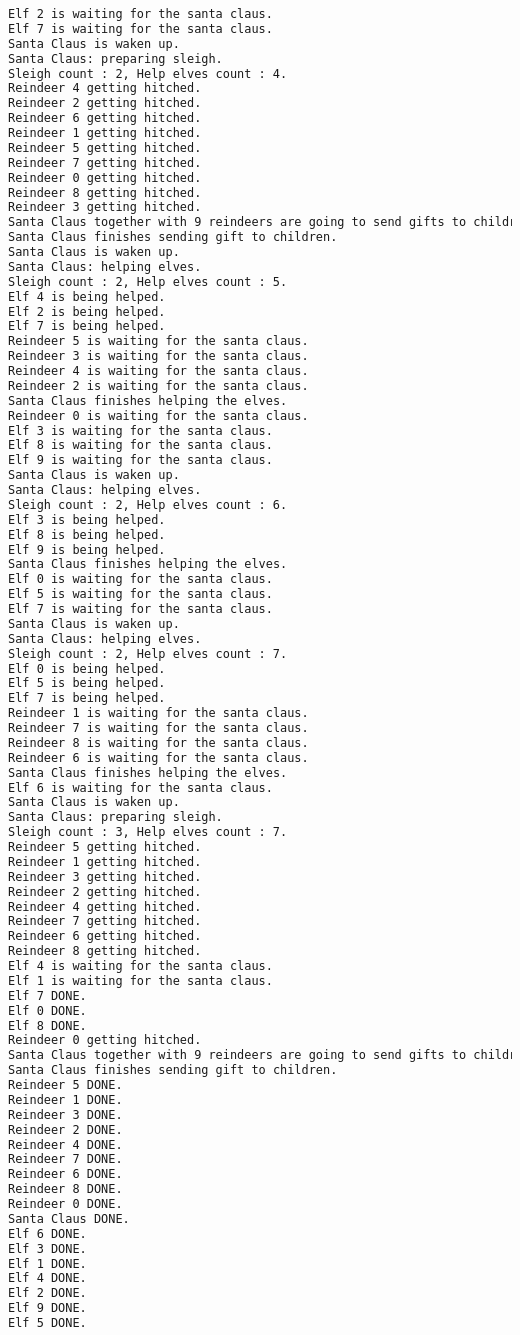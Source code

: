 \begin{lstlisting}[language=bash]
Elf 2 is waiting for the santa claus.
Elf 7 is waiting for the santa claus.
Santa Claus is waken up.
Santa Claus: preparing sleigh.
Sleigh count : 2, Help elves count : 4.
Reindeer 4 getting hitched.
Reindeer 2 getting hitched.
Reindeer 6 getting hitched.
Reindeer 1 getting hitched.
Reindeer 5 getting hitched.
Reindeer 7 getting hitched.
Reindeer 0 getting hitched.
Reindeer 8 getting hitched.
Reindeer 3 getting hitched.
Santa Claus together with 9 reindeers are going to send gifts to children around the world.
Santa Claus finishes sending gift to children.
Santa Claus is waken up.
Santa Claus: helping elves.
Sleigh count : 2, Help elves count : 5.
Elf 4 is being helped.
Elf 2 is being helped.
Elf 7 is being helped.
Reindeer 5 is waiting for the santa claus.
Reindeer 3 is waiting for the santa claus.
Reindeer 4 is waiting for the santa claus.
Reindeer 2 is waiting for the santa claus.
Santa Claus finishes helping the elves.
Reindeer 0 is waiting for the santa claus.
Elf 3 is waiting for the santa claus.
Elf 8 is waiting for the santa claus.
Elf 9 is waiting for the santa claus.
Santa Claus is waken up.
Santa Claus: helping elves.
Sleigh count : 2, Help elves count : 6.
Elf 3 is being helped.
Elf 8 is being helped.
Elf 9 is being helped.
Santa Claus finishes helping the elves.
Elf 0 is waiting for the santa claus.
Elf 5 is waiting for the santa claus.
Elf 7 is waiting for the santa claus.
Santa Claus is waken up.
Santa Claus: helping elves.
Sleigh count : 2, Help elves count : 7.
Elf 0 is being helped.
Elf 5 is being helped.
Elf 7 is being helped.
Reindeer 1 is waiting for the santa claus.
Reindeer 7 is waiting for the santa claus.
Reindeer 8 is waiting for the santa claus.
Reindeer 6 is waiting for the santa claus.
Santa Claus finishes helping the elves.
Elf 6 is waiting for the santa claus.
Santa Claus is waken up.
Santa Claus: preparing sleigh.
Sleigh count : 3, Help elves count : 7.
Reindeer 5 getting hitched.
Reindeer 1 getting hitched.
Reindeer 3 getting hitched.
Reindeer 2 getting hitched.
Reindeer 4 getting hitched.
Reindeer 7 getting hitched.
Reindeer 6 getting hitched.
Reindeer 8 getting hitched.
Elf 4 is waiting for the santa claus.
Elf 1 is waiting for the santa claus.
Elf 7 DONE.
Elf 0 DONE.
Elf 8 DONE.
Reindeer 0 getting hitched.
Santa Claus together with 9 reindeers are going to send gifts to children around the world.
Santa Claus finishes sending gift to children.
Reindeer 5 DONE.
Reindeer 1 DONE.
Reindeer 3 DONE.
Reindeer 2 DONE.
Reindeer 4 DONE.
Reindeer 7 DONE.
Reindeer 6 DONE.
Reindeer 8 DONE.
Reindeer 0 DONE.
Santa Claus DONE.
Elf 6 DONE.
Elf 3 DONE.
Elf 1 DONE.
Elf 4 DONE.
Elf 2 DONE.
Elf 9 DONE.
Elf 5 DONE.
\end{lstlisting}

